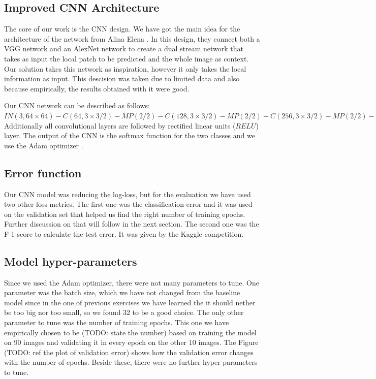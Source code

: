 \documentclass[10pt,conference,compsocconf]{IEEEtran}
\begin{document}
\subsection{Improved CNN Architecture}
The core of our work is the CNN design. We have got the main idea for the architecture
of the network from Alina Elena \cite{mthesis}. In this design, they connect both a VGG network \cite{vgg} and an AlexNet network \cite{alexnet} to create a dual stream network that takes as input the local patch to be predicted and the whole image as context.
Our solution takes this network as inspiration, however it only takes the local information as input. This descision was taken due to limited data and also because empirically, the results obtained with it were good.

Our CNN network can be described as follows: \\
$IN(3, 64\times64)
-C(64, 3\times3 /2) - MP(2 / 2) - C(128, 3\times3 /2) - MP(2 / 2)
-C(256, 3\times3 /2) - MP(2 / 2) - C(512, 3\times3 /2) - MP(2 / 2)
-FC(2048)-FC(2048)-FC(2)$\\

Additionally all convolutional layers are followed by rectified linear units ($RELU$) layer. The output of the CNN is the softmax function for the two classes and we use the Adam optimizer \cite{adam}.


\subsection{Error function}
Our CNN model was reducing the log-loss, but for the evaluation we have used two other loss metrics. The first one was
the classification error and it was used on the validation set that helped us find the right number of training epochs. 
Further discussion on that will follow in the next section. The second one was the F-1 score to calculate
the test error. It was given by the Kaggle competition.


\subsection{Model hyper-parameters}
Since we used the Adam optimizer, there were not many parameters to tune. One parameter was the batch size, which we 
have not changed from the baseline model since in the one of previous exercises we have learned the it should nether be too
big nor too small, so we found 32 to be a good choice. The only other parameter to tune was the number of training epochs.
This one we have empirically chosen to be (TODO: state the number) based on training the model on 90 images and 
validating it in every epoch on the other 10 images. The Figure (TODO: ref the plot of validation error) shows
how the validation error changes with the number of epochs. Beside these, there were no further hyper-parameters to tune.
\end{document}
